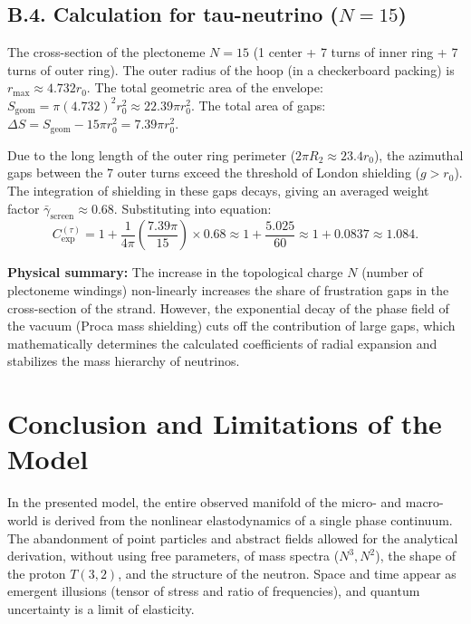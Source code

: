 \documentclass[11pt,a4paper]{article}
\begin{document}
\subsection*{B.4. Calculation for tau-neutrino ($N=15$)}
The cross-section of the plectoneme $N=15$ (1 center + 7 turns of inner ring + 7 turns of outer ring).
The outer radius of the hoop (in a checkerboard packing) is $r_{\text{max}} \approx 4.732 r_0$.
The total geometric area of the envelope: $S_{\text{geom}} = \pi (4.732)^2 r_0^2 \approx 22.39 \pi r_0^2$.
The total area of gaps: $\Delta S = S_{\text{geom}} - 15 \pi r_0^2 = 7.39 \pi r_0^2$.

Due to the long length of the outer ring perimeter ($2\pi R_2 \approx 23.4 r_0$), the azimuthal gaps between the 7 outer turns exceed the threshold of London shielding ($g > r_0$). The integration of shielding in these gaps decays, giving an averaged weight factor $\bar{\gamma}_{\text{screen}} \approx 0.68$.
Substituting into equation:
\begin{equation}
C_{\text{exp}}^{(\tau)} = 1 + \frac{1}{4\pi} \left( \frac{7.39 \pi}{15} \right) \times 0.68 \approx 1 + \frac{5.025}{60} \approx 1 + 0.0837 \approx \mathbf{1.084}.
\end{equation}

\textbf{Physical summary:} The increase in the topological charge $N$ (number of plectoneme windings) non-linearly increases the share of frustration gaps in the cross-section of the strand. However, the exponential decay of the phase field of the vacuum (Proca mass shielding) cuts off the contribution of large gaps, which mathematically determines the calculated coefficients of radial expansion and stabilizes the mass hierarchy of neutrinos.

\section*{Conclusion and Limitations of the Model}

In the presented model, the entire observed manifold of the micro- and macro-world is derived from the nonlinear elastodynamics of a single phase continuum. The abandonment of point particles and abstract fields allowed for the analytical derivation, without using free parameters, of mass spectra ($N^3, N^2$), the shape of the proton $T(3,2)$, and the structure of the neutron. Space and time appear as emergent illusions (tensor of stress and ratio of frequencies), and quantum uncertainty is a limit of elasticity.
\end{document}

